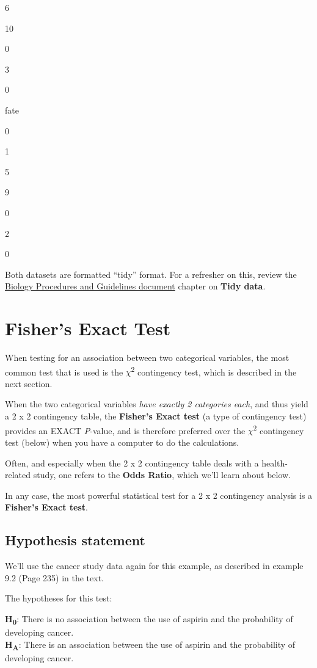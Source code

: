 \documentclass[
]{book}
\begin{document}
6

10

0

3

0

fate

0

1

5

9

0

2

0

Both datasets are formatted ``tidy'' format. For a refresher on this, review the \href{https://ubco-biology.github.io/Procedures-and-Guidelines/tidy-data.html}{Biology Procedures and Guidelines document} chapter on \textbf{Tidy data}.

\section{Fisher's Exact Test}\label{fishertest}

When testing for an association between two categorical variables, the most common test that is used is the \(\chi\)\textsuperscript{2} contingency test, which is described in the next section.

When the two categorical variables \emph{have exactly 2 categories each}, and thus yield a 2 x 2 contingency table, the \textbf{Fisher's Exact test} (a type of contingency test) provides an EXACT \emph{P}-value, and is therefore preferred over the \(\chi\)\textsuperscript{2} contingency test (below) when you have a computer to do the calculations.

Often, and especially when the 2 x 2 contingency table deals with a health-related study, one refers to the \textbf{Odds Ratio}, which we'll learn about below.

In any case, the most powerful statistical test for a 2 x 2 contingency analysis is a \textbf{Fisher's Exact test}.

\subsection{Hypothesis statement}\label{fisher_hyp}

We'll use the cancer study data again for this example, as described in example 9.2 (Page 235) in the text.

The hypotheses for this test:

\textbf{H\textsubscript{0}}: There is no association between the use of aspirin and the probability of developing cancer.\\
\textbf{H\textsubscript{A}}: There is an association between the use of aspirin and the probability of developing cancer.
\end{document}
